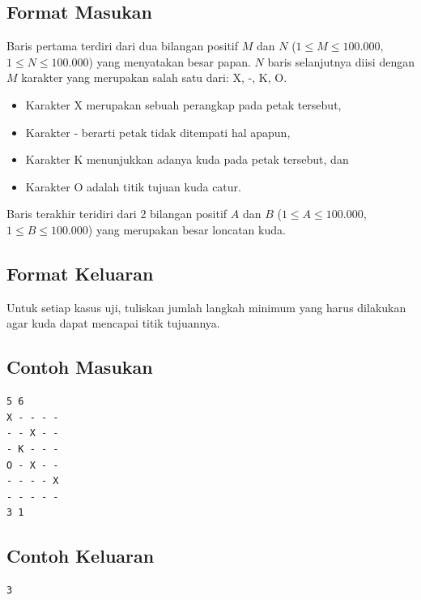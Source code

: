 \documentclass{article}
\begin{document}
\subsection*{Format Masukan}

Baris pertama terdiri dari dua bilangan positif $M$ dan $N$ ($1 \leq M \leq 100.000$, $1 \leq N \leq 100.000$) yang menyatakan besar papan.
$N$ baris selanjutnya diisi dengan $M$ karakter yang merupakan salah satu dari: X, -, K, O.

\begin{itemize}
    \setlength\itemsep{0pt}
    \item Karakter X merupakan sebuah perangkap pada petak tersebut,
    \item Karakter - berarti petak tidak ditempati hal apapun,
    \item Karakter K menunjukkan adanya kuda pada petak tersebut, dan
    \item Karakter O adalah titik tujuan kuda catur.
\end{itemize}

Baris terakhir teridiri dari 2 bilangan positif $A$ dan $B$ ($1 \leq A \leq 100.000$, $1 \leq B \leq 100.000$) yang merupakan besar loncatan kuda.

\subsection*{Format Keluaran}

Untuk setiap kasus uji, tuliskan jumlah langkah minimum yang harus dilakukan agar kuda dapat mencapai titik tujuannya.
\\

\begin{multicols}{2}
\subsection*{Contoh Masukan}
\begin{lstlisting}
5 6
X - - - -
- - X - -
- K - - -
O - X - -
- - - - X
- - - - -
3 1
\end{lstlisting}
\columnbreak
\subsection*{Contoh Keluaran}
\begin{lstlisting}
3
\end{lstlisting}
\vfill
\null
\end{multicols}


\pagebreak
\end{document}
